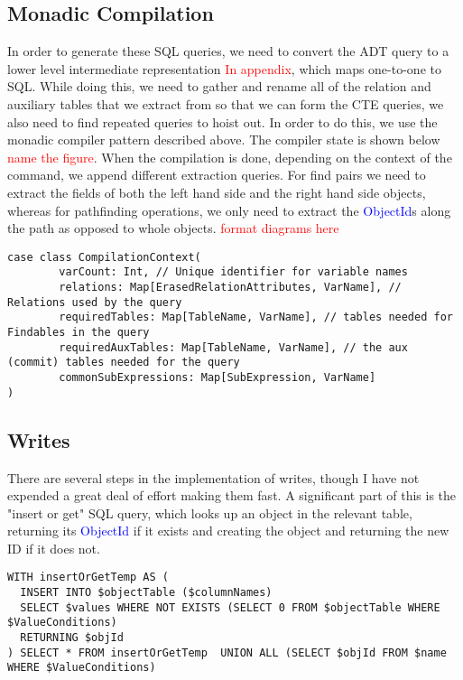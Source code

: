 \documentclass[12pt,a4paper,twoside,openright]{report}
\newcommand\todo[1]{\textcolor{red}{#1}}
\newcommand\codeName[1]{\textcolor{blue}{#1}}
\begin{document}
{{\begin{framed}
\begin{verbatim}
\end{verbatim}
\end{framed}
	\subsection{Monadic Compilation}
	In order to generate these SQL queries, we need to convert the ADT query to a lower level intermediate representation \todo{In appendix}, which maps one-to-one to SQL. While doing this, we need to gather and rename all of the relation and auxiliary tables that we extract from so that we can form the CTE queries, we also need to find repeated queries to hoist out. In order to do this, we use the monadic compiler pattern described above. The compiler state is shown below \todo{name the figure}. When the compilation is done, depending on the context of the command, we append different extraction queries. For find pairs we need to extract the fields of both the left hand side and the right hand side objects, whereas for pathfinding operations, we only need to extract the \codeName{ObjectId}s along the path as opposed to whole  objects. \todo{format diagrams here}
	
	\begin{framed}
	\begin{verbatim}
case class CompilationContext(
        varCount: Int, // Unique identifier for variable names
        relations: Map[ErasedRelationAttributes, VarName], // Relations used by the query
        requiredTables: Map[TableName, VarName], // tables needed for Findables in the query
	    requiredAuxTables: Map[TableName, VarName], // the aux (commit) tables needed for the query
        commonSubExpressions: Map[SubExpression, VarName]
)

	\end{verbatim}
	\end{framed}
	\subsection{Writes}
	There are several steps in the implementation of writes, though I have not expended  a great deal of effort making them fast. A significant part of this is the "insert or get" SQL query, which looks up an object in the relevant table, returning its \codeName{ObjectId} if it exists and creating the object and returning the new ID if it does not.
	
	\begin{framed}
		\begin{verbatim}
WITH insertOrGetTemp AS (
  INSERT INTO $objectTable ($columnNames)
  SELECT $values WHERE NOT EXISTS (SELECT 0 FROM $objectTable WHERE $ValueConditions)
  RETURNING $objId
) SELECT * FROM insertOrGetTemp  UNION ALL (SELECT $objId FROM $name WHERE $ValueConditions)
		\end{verbatim}
	\end{framed}
	
}}
\end{document}
